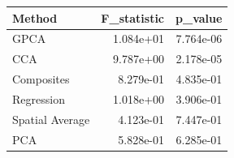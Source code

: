 \begin{tabular}{lrr}
\toprule
Method & F_statistic & p_value \\
\midrule
GPCA & 1.084e+01 & 7.764e-06 \\
CCA & 9.787e+00 & 2.178e-05 \\
Composites & 8.279e-01 & 4.835e-01 \\
Regression & 1.018e+00 & 3.906e-01 \\
Spatial Average & 4.123e-01 & 7.447e-01 \\
PCA & 5.828e-01 & 6.285e-01 \\
\bottomrule
\end{tabular}
